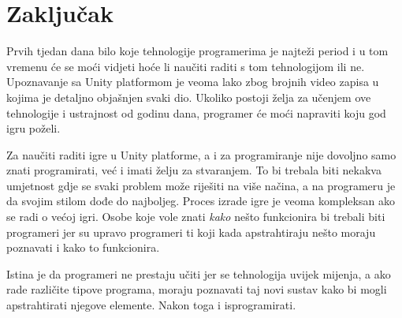 \section{Zaključak}
Prvih tjedan dana bilo koje tehnologije programerima je najteži period i u tom vremenu će se moći vidjeti hoće li naučiti raditi s tom tehnologijom ili ne. Upoznavanje sa Unity platformom je veoma lako zbog brojnih video zapisa u kojima je detaljno objašnjen svaki dio. Ukoliko postoji želja za učenjem ove tehnologije i ustrajnost od godinu dana, programer će moći napraviti koju god igru poželi.

Za naučiti raditi igre u Unity platforme, a i za programiranje nije dovoljno samo znati programirati, već i imati želju za stvaranjem. To bi trebala biti nekakva umjetnost gdje se svaki problem može riješiti na više načina, a na programeru je da svojim stilom dođe do najboljeg. Proces izrade igre je veoma kompleksan ako se radi o većoj igri. Osobe koje vole znati \emph{kako} nešto funkcionira bi trebali biti programeri jer su upravo programeri ti koji kada apstrahtiraju nešto moraju poznavati i kako to funkcionira.
 
Istina je da programeri ne prestaju učiti jer se tehnologija uvijek mijenja, a ako rade različite tipove programa, moraju poznavati taj novi sustav kako bi mogli apstrahtirati njegove elemente. Nakon toga i isprogramirati.